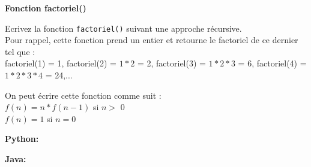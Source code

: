 \begin{Exercice} \textbf{Fonction factoriel()} 
	
        Ecrivez la fonction \lstinline{factoriel()} suivant une approche récursive. \\ 
        
        Pour rappel, cette fonction prend un entier et retourne le factoriel de ce dernier tel que : \\
        
        factoriel(1) = 1, factoriel(2) = $1*2$ = 2, factoriel(3) = $1*2*3$ = 6, factoriel(4) = $1*2*3*4$ = 24,...
          
        
            \begin{conseil} 
            On peut écrire cette fonction comme suit : \\
            
            $f(n) = n * f(n-1)$ si $n >$ 0 \\
            
            $f(n) = 1$ si $n = 0$
            
            \end{conseil} 
        
            \begin{solution} 
                \textbf{Python:}
                
                \textbf{Java:}
                
            \end{solution} 
        
\end{Exercice}

